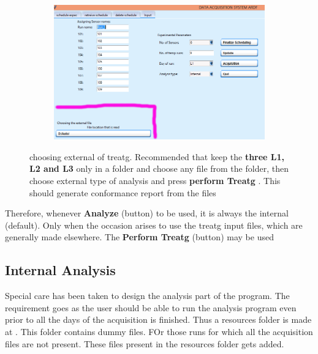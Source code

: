 \documentclass[12pt]{article}
\begin{document}
    
   
   \begin{figure}[H]
 
    \begin{subfigure}{1.0\textwidth}
    \includegraphics[scale=0.5]{images/choosing_external.png} 
    \label{fig:DJp1}
    \end{subfigure}
 
 \caption{choosing external of treatg. Recommended that keep the \textbf{three L1, L2  and L3} only in a folder and choose any file from the folder, then choose external type of analysis and press \textbf{perform Treatg} . This should generate conformance report from the files }
\label{fig6}
\end{figure}
   
   
   
  Therefore, whenever \textbf{Analyze} (button) to be used, it is always the internal (default). Only when the occasion arises to use the treatg input files, which are generally made elsewhere. The \textbf{Perform Treatg} (button) may be used 
 
    
    
    
    
    
    
    
    \subsection{ Internal Analysis}
    Special care has been taken to design the analysis part of the program. The requirement goes as the user should be able to run the analysis program even prior to all the days of the acquisition is finished. Thus a resources folder is made at . This folder contains dummy files. FOr those runs for which all the acquisition  files are not present. These files present in the resources folder gets added. 
    
\end{document}

